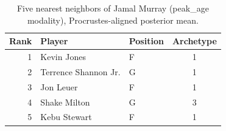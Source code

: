 \begin{table}[htbp]
  \centering\small
  \begin{tabular}{rllc}
    \toprule
    Rank & Player & Position & Archetype \\
    \midrule
    1 & Kevin Jones & F & 1 \\
    2 & Terrence Shannon Jr. & G & 1 \\
    3 & Jon Leuer & F & 1 \\
    4 & Shake Milton & G & 3 \\
    5 & Kebu Stewart & F & 1 \\
    \bottomrule
  \end{tabular}
  \caption{Five nearest neighbors of Jamal Murray (peak_age modality), Procrustes-aligned posterior mean.}
  \label{tab:Jamal_Murray_neighbors_peak_age}
\end{table}

